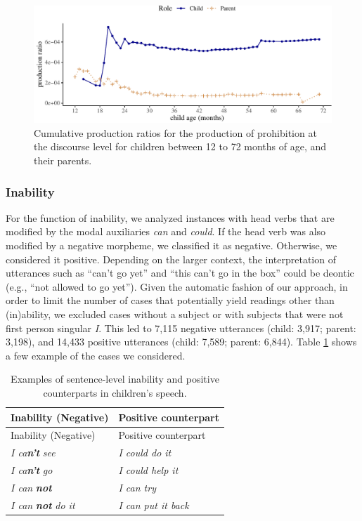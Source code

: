 \documentclass[
  man,floatsintext]{apa6}
\begin{document}
\begin{figure}[H]

{\centering \includegraphics{neg_construction_article_files/figure-latex/prohibitiondiscourse-1} 

}

\caption{Cumulative production ratios for the production of prohibition at the discourse level for children between 12 to 72 months of age, and their parents.}\label{fig:prohibitiondiscourse}
\end{figure}

\subsubsection{Inability}\label{inability}

For the function of inability, we analyzed instances with head verbs that are modified by the modal auxiliaries \emph{can} and \emph{could}. If the head verb was also modified by a negative morpheme, we classified it as negative. Otherwise, we considered it positive. Depending on the larger context, the interpretation of utterances such as ``can't go yet'' and ``this can't go in the box'' could be deontic (e.g., ``not allowed to go yet''). Given the automatic fashion of our approach, in order to limit the number of cases that potentially yield readings other than (in)ability, we excluded cases without a subject or with subjects that were not first person singular \emph{I}. This led to 7,115 negative utterances (child: 3,917; parent: 3,198), and 14,433 positive utterances (child: 7,589; parent: 6,844). Table \ref{tab:inab} shows a few example of the cases we considered.

\begin{longtable}[]{@{}ll@{}}
\caption{\label{tab:inab} Examples of sentence-level inability and positive counterparts in children's speech.}\tabularnewline
\toprule\noalign{}
Inability (Negative) & Positive counterpart \\
\midrule\noalign{}
\endfirsthead
\toprule\noalign{}
Inability (Negative) & Positive counterpart \\
\midrule\noalign{}
\endhead
\bottomrule\noalign{}
\endlastfoot
\emph{I ca\textbf{n't}} \emph{see} & \emph{I could do it} \\
\emph{I ca\textbf{n't}} \emph{go} & \emph{I could help it} \\
\emph{I can} \textbf{\emph{not}} & \emph{I can try} \\
\emph{I can} \textbf{\emph{not}} \emph{do it} & \emph{I can put it back} \\
\end{longtable}
\end{document}
